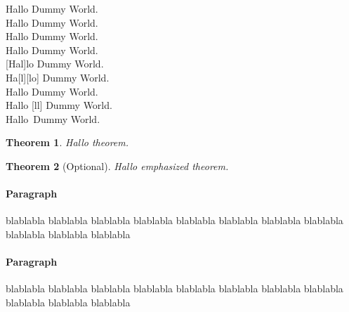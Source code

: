 \documentclass[12pt]{article}
\begin{document}
{\begin{lcHtmlBlock}
Hallo Dummy World.\\
%
\newenvironment{c}{Hallo}{World}
\begin{c} Dummy \end{c}.\\
%
\newenvironment{d}[1]{#1}{World}
\begin{d}{Hallo} Dummy \end{d}.\\
%
\newenvironment{e}[1]{#1}{World}
\newcommand{\begin@e@om}{#1#2}
\begin{e}{Hallo} Dummy \end{e}.\\
\begin{e}[Hal]{lo} Dummy \end{e}.\\
%
\newcommand{\begin@e@moo}{#1#2#3}
\begin{e}{Ha}[l][lo] Dummy \end{e}.\\
%
\newenvironment{ee}{Hallo }{World}
\newcommand{\begin@ee@o}{Ha#1o}
\begin{ee} Dummy \end{ee}.\\
\begin{ee}[ll] Dummy \end{ee}.\\
%
Hallo~Dummy World.

\newtheorem{mytheorem}{Theorem}

\begin{mytheorem}
    Hallo theorem.
\end{mytheorem}

\begin{mytheorem}[Optional]
    Hallo {\em emphasized\/} theorem.
\end{mytheorem}

\paragraph{Paragraph}

blablabla blablabla blablabla blablabla blablabla blablabla blablabla 
blablabla blablabla blablabla blablabla 

\paragraph*{Paragraph}

blablabla blablabla blablabla blablabla blablabla blablabla blablabla 
blablabla blablabla blablabla blablabla 


\end{lcHtmlBlock}}
\end{document}
